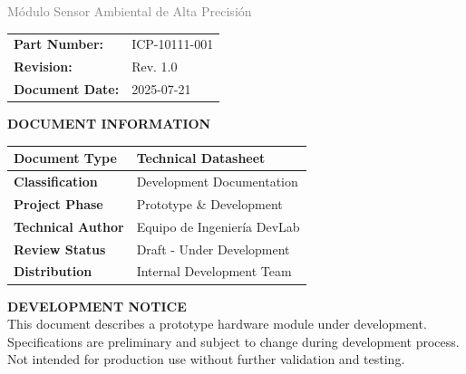 \documentclass[11pt,a4paper]{article}
\begin{document}
\begin{titlepage}
    {\LARGE \textcolor{gray}{Módulo Sensor Ambiental de Alta Precisión}}\\[0.5cm]
    
    
    \begin{tcolorbox}[
        colback=gray!10!white,
        colframe=gray!50!black,
        width=0.7\textwidth,
        arc=1mm,
        boxrule=1pt
    ]
    \centering
    \begin{tabular}{l l}
    \textbf{Part Number:} & ICP-10111-001 \\
    \textbf{Revision:} & Rev. 1.0 \\
    \textbf{Document Date:} & 2025-07-21
    \end{tabular}
    \end{tcolorbox}
    
    \vspace{1cm}
    
    \begin{tcolorbox}[
        colback=white,
        colframe=black,
        width=0.9\textwidth,
        arc=0mm,
        boxrule=1pt,
        halign=center
    ]
    {\normalsize \textbf{DOCUMENT INFORMATION}}\\[0.3cm]
    \begin{tabular}{|l|l|}
    \hline
    \textbf{Document Type} & Technical Datasheet \\
    \hline
    \textbf{Classification} & Development Documentation \\
    \hline
    \textbf{Project Phase} & Prototype \& Development \\
    \hline
    
    \textbf{Technical Author} & Equipo de Ingeniería DevLab \\
    \hline
    
    \textbf{Review Status} & Draft - Under Development \\
    \hline
    \textbf{Distribution} & Internal Development Team \\
    \hline
    \end{tabular}
    \end{tcolorbox}
    
    \vspace{0.8cm}
    
    \begin{tcolorbox}[
        colback=yellow!5!white,
        colframe=orange!75!black,
        width=\textwidth,
        arc=1mm,
        boxrule=1pt
    ]
    \centering
    {\small \textbf{DEVELOPMENT NOTICE}}\\[0.2cm]
    {\footnotesize This document describes a prototype hardware module under development.}\\
    {\footnotesize Specifications are preliminary and subject to change during development process.}\\
    {\footnotesize Not intended for production use without further validation and testing.}
    \end{tcolorbox}
    

\end{titlepage}
\end{document}

